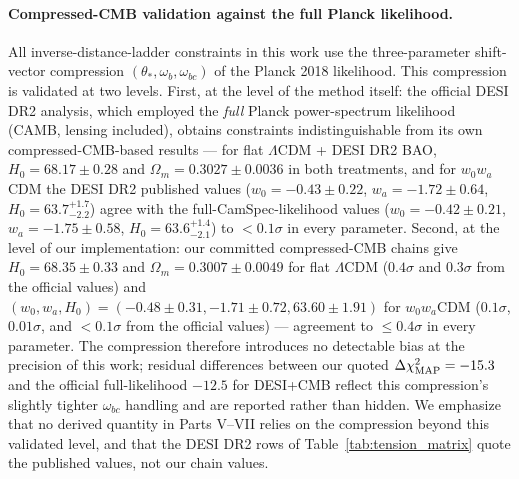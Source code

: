 \documentclass[11pt,letterpaper]{article}
\begin{document}
\paragraph{Compressed-CMB validation against the full Planck likelihood.} All inverse-distance-ladder constraints in this work use the three-parameter shift-vector compression $(\theta_*, \omega_b, \omega_{bc})$ of the Planck 2018 likelihood. This compression is validated at two levels. First, at the level of the method itself: the official DESI DR2 analysis, which employed the \emph{full} Planck power-spectrum likelihood (CAMB, lensing included), obtains constraints indistinguishable from its own compressed-CMB-based results --- for flat $\Lambda$CDM + DESI DR2 BAO, $H_0 = 68.17 \pm 0.28$ and $\Omega_m = 0.3027 \pm 0.0036$ in both treatments, and for $w_0w_a$CDM the DESI DR2 published values ($w_0 = -0.43 \pm 0.22$, $w_a = -1.72 \pm 0.64$, $H_0 = 63.7^{+1.7}_{-2.2}$) agree with the full-CamSpec-likelihood values ($w_0 = -0.42 \pm 0.21$, $w_a = -1.75 \pm 0.58$, $H_0 = 63.6^{+1.4}_{-2.1}$) to $< 0.1\sigma$ in every parameter. Second, at the level of our implementation: our committed compressed-CMB chains give $H_0 = 68.35 \pm 0.33$ and $\Omega_m = 0.3007 \pm 0.0049$ for flat $\Lambda$CDM ($0.4\sigma$ and $0.3\sigma$ from the official values) and $(w_0, w_a, H_0) = (-0.48 \pm 0.31, -1.71 \pm 0.72, 63.60 \pm 1.91)$ for $w_0w_a$CDM ($0.1\sigma$, $0.01\sigma$, and $< 0.1\sigma$ from the official values) --- agreement to $\le 0.4\sigma$ in every parameter. The compression therefore introduces no detectable bias at the precision of this work; residual differences between our quoted $\Delta\chi^2_{\rm MAP} = -15.3$ and the official full-likelihood $-12.5$ for DESI+CMB reflect this compression's slightly tighter $\omega_{bc}$ handling and are reported rather than hidden. We emphasize that no derived quantity in Parts V--VII relies on the compression beyond this validated level, and that the DESI DR2 rows of Table~\ref{tab:tension_matrix} quote the published values, not our chain values.
\end{document}
